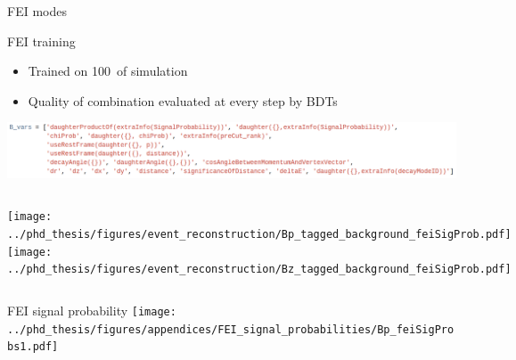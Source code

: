 \documentclass[xcolor=dvipsnames]{beamer}
\begin{document}
\begin{frame}{FEI modes}
   \centering
   \resizebox{0.45\textheight}{!}{
      
   }
\end{frame}

\begin{frame}{FEI training}
   \scriptsize\centering
   \begin{itemize}
      \item Trained on 100~\invfb of simulation
      \item Quality of combination evaluated at every step by BDTs
   \end{itemize}
   \includegraphics[width=1\textwidth]{figures/fei_b_vars.png}

   \begin{columns}
      \texttt{[image: ../phd\_thesis/figures/event\_reconstruction/Bp\_tagged\_background\_feiSigProb.pdf]}
      \texttt{[image: ../phd\_thesis/figures/event\_reconstruction/Bz\_tagged\_background\_feiSigProb.pdf]}
   \end{columns}
  
\end{frame}

\begin{frame}{FEI signal probability \feiProb}
\centering
      \texttt{[image: ../phd\_thesis/figures/appendices/FEI\_signal\_probabilities/Bp\_feiSigProbs1.pdf]}

\end{frame}
\end{document}
